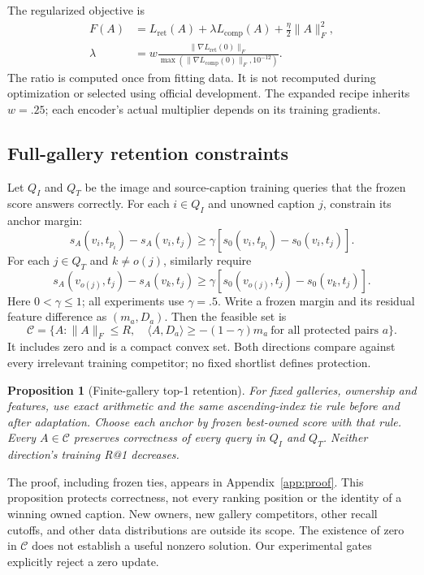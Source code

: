 \documentclass[11pt]{article}
\newtheorem{proposition}{Proposition}
\newcommand{\ip}[2]{\langle #1,#2\rangle}
\newcommand{\norm}[1]{\lVert #1\rVert}
\begin{document}
The regularized objective is
\begin{align}
 F(A)&=L_{\mathrm{ret}}(A)+\lambda L_{\mathrm{comp}}(A)
           +\tfrac\eta2\norm{A}_F^2,\label{eq:objective}\\
 \lambda&=w\frac{\norm{\nabla L_{\mathrm{ret}}(0)}_F}
                    {\max(\norm{\nabla L_{\mathrm{comp}}(0)}_F,10^{-12})}.
 \label{eq:lambda}
\end{align}
The ratio is computed once from fitting data. It is not recomputed during
optimization or selected using official development. The expanded recipe
inherits $w=.25$; each encoder's actual multiplier depends on its training
gradients.

\subsection{Full-gallery retention constraints}
Let $Q_I$ and $Q_T$ be the image and source-caption training queries that
the frozen score answers correctly. For each $i\in Q_I$ and unowned caption
$j$, constrain its anchor margin:
\begin{equation}
 s_A(v_i,t_{p_i})-s_A(v_i,t_j)
 \ge\gamma[s_0(v_i,t_{p_i})-s_0(v_i,t_j)].\label{eq:ci}
\end{equation}
For each $j\in Q_T$ and $k\ne o(j)$, similarly require
\begin{equation}
 s_A(v_{o(j)},t_j)-s_A(v_k,t_j)
 \ge\gamma[s_0(v_{o(j)},t_j)-s_0(v_k,t_j)].\label{eq:ct}
\end{equation}
Here $0<\gamma\le1$; all experiments use $\gamma=.5$.
Write a frozen margin and its residual feature difference as $(m_a,D_a)$.
Then the feasible set is
\begin{equation}
 \mathcal C=\{A:\norm{A}_F\le R,\quad
                 \ip{A}{D_a}\ge-(1-\gamma)m_a\ \text{for all protected pairs }a\}.
 \label{eq:feasible}
\end{equation}
It includes zero and is a compact convex set. Both directions compare
against every irrelevant training competitor; no fixed shortlist defines
protection.

\begin{proposition}[Finite-gallery top-1 retention]\label{prop:retention}
For fixed galleries, ownership and features, use exact arithmetic and the
same ascending-index tie rule before and after adaptation. Choose each
anchor by frozen best-owned score with that rule. Every $A\in\mathcal C$
preserves correctness of every query in $Q_I$ and $Q_T$. Neither direction's
training R@1 decreases.
\end{proposition}
The proof, including frozen ties, appears in Appendix~\ref{app:proof}.
This proposition protects correctness, not every ranking position or the
identity of a winning owned caption. New owners, new gallery competitors,
other recall cutoffs, and other data distributions are outside its scope.
The existence of zero in $\mathcal C$ does not establish a useful nonzero
solution. Our experimental gates explicitly reject a zero update.
\end{document}
